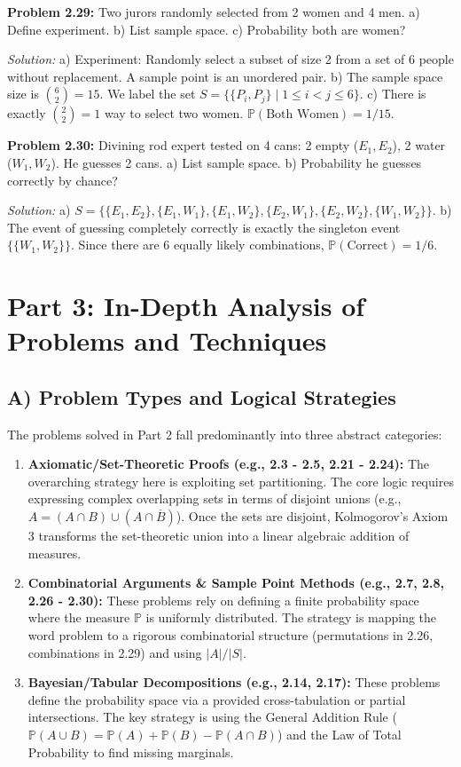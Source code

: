 \documentclass[11pt]{article}
\newcommand{\prob}[1]{\vspace{4mm}\noindent\textbf{Problem #1:}}
\newcommand{\sol}{\vspace{2mm}\noindent\textit{Solution: }}
\begin{document}
\prob{2.29}
Two jurors randomly selected from 2 women and 4 men.
a) Define experiment. b) List sample space. c) Probability both are women?

\sol 
a) Experiment: Randomly select a subset of size 2 from a set of 6 people without replacement. A sample point is an unordered pair.
b) The sample space size is $\binom{6}{2} = 15$. We label the set $S = \{ \{P_i, P_j\} \mid 1 \le i < j \le 6\}$.
c) There is exactly $\binom{2}{2} = 1$ way to select two women. $\mathbb{P}(\text{Both Women}) = 1/15$.

\prob{2.30}
Divining rod expert tested on 4 cans: 2 empty ($E_1, E_2$), 2 water ($W_1, W_2$). He guesses 2 cans.
a) List sample space. b) Probability he guesses correctly by chance?

\sol 
a) $S = \{\{E_1, E_2\}, \{E_1, W_1\}, \{E_1, W_2\}, \{E_2, W_1\}, \{E_2, W_2\}, \{W_1, W_2\}\}$.
b) The event of guessing completely correctly is exactly the singleton event $\{\{W_1, W_2\}\}$. Since there are 6 equally likely combinations, $\mathbb{P}(\text{Correct}) = 1/6$.

\section{Part 3: In-Depth Analysis of Problems and Techniques}

\subsection{A) Problem Types and Logical Strategies}
The problems solved in Part 2 fall predominantly into three abstract categories:
\begin{enumerate}
    \item \textbf{Axiomatic/Set-Theoretic Proofs (e.g., 2.3 - 2.5, 2.21 - 2.24):} The overarching strategy here is exploiting set partitioning. The core logic requires expressing complex overlapping sets in terms of disjoint unions (e.g., $A = (A \cap B) \cup (A \cap \overline{B})$). Once the sets are disjoint, Kolmogorov's Axiom 3 transforms the set-theoretic union into a linear algebraic addition of measures.
    \item \textbf{Combinatorial Arguments \& Sample Point Methods (e.g., 2.7, 2.8, 2.26 - 2.30):} These problems rely on defining a finite probability space where the measure $\mathbb{P}$ is uniformly distributed. The strategy is mapping the word problem to a rigorous combinatorial structure (permutations in 2.26, combinations in 2.29) and using $|A|/|S|$.
    \item \textbf{Bayesian/Tabular Decompositions (e.g., 2.14, 2.17):} These problems define the probability space via a provided cross-tabulation or partial intersections. The key strategy is using the General Addition Rule ($\mathbb{P}(A \cup B) = \mathbb{P}(A) + \mathbb{P}(B) - \mathbb{P}(A \cap B)$) and the Law of Total Probability to find missing marginals.
\end{enumerate}
\end{document}
